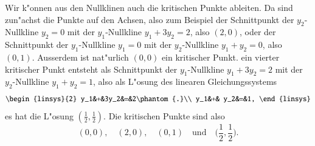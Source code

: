 \begin{beispiel}
Wir k"onnen aus den Nullklinen auch die kritischen Punkte ableiten.
Da sind zun"achst die Punkte auf den Achsen, also zum Beispiel
der Schnittpunkt der $y_2$-Nullkline $y_2=0$ mit der $y_1$-Nullkline
$y_1+3y_2=2$, also $(2,0)$, oder der Schnittpunkt der
$y_1$-Nullkline $y_1=0$ mit der $y_2$-Nullkline $y_1+y_2=0$, also $(0,1)$.
Ausserdem ist nat"urlich $(0,0)$ ein kritischer Punkt.
ein vierter kritischer Punkt entsteht als Schnittpunkt
der $y_1$-Nullkline $y_1+3y_2=2$ mit der $y_2$-Nullkline $y_1+y_2=1$,
also als L"osung des linearen Gleichungssystems
\[
\begin{linsys}{2}
y_1&+&3y_2&=&2\phantom{.}\\
y_1&+& y_2&=&1,
\end{linsys}
\]
es hat die L"osung $(\frac12,\frac12)$.
Die kritischen Punkte sind also
\begin{equation}
(0,0),\quad
(2,0),\quad
(0,1)\quad\text{und}\quad
\biggl(\frac12,\frac12\biggr).
\label{geometrie:nullklinen-krit}
\end{equation}


\end{beispiel}
